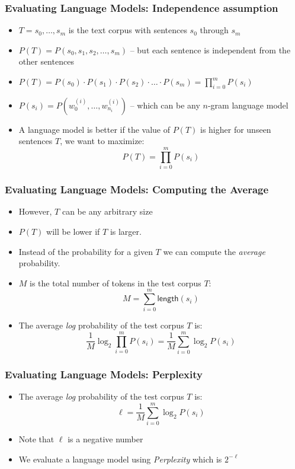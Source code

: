 \begin{frame}
\frametitle{Evaluating Language Models: Independence assumption}
\begin{itemize}[<+->]
\item $T = s_0, \ldots, s_m$ is the text corpus with sentences $s_0$ through $s_m$
\item $P(T) = P(s_0, s_1, s_2, \ldots, s_m)$ -- but each sentence is independent from the other sentences
\item $P(T) = P(s_0) \cdot P(s_1) \cdot P(s_2) \cdot \ldots \cdot P(s_m) = \prod_{i=0}^m P(s_i)$ 
\item $P(s_i) = P(w_0^{(i)}, \ldots, w_{n_i}^{(i)})$ -- which can be any $n$-gram language model
\item A language model is better if the value of $P(T)$ is higher for unseen sentences $T$, we want to maximize:
\[ P(T) = \prod_{i=0}^m P(s_i) \]
\end{itemize}
\end{frame}

\begin{frame}
\frametitle{Evaluating Language Models: Computing the Average}
\begin{itemize}[<+->]
\item However, $T$ can be any arbitrary size
\item $P(T)$ will be lower if $T$ is larger.
\item Instead of the probability for a given $T$ we can compute the {\em average} probability.
\item $M$ is the total number of tokens in the test corpus $T$:
\[ M = \sum_{i=0}^m \textsf{length}(s_i) \]
\item The average {\em log} probability of the test corpus $T$ is:
\[ \frac{1}{M} \log_2 \prod_{i=0}^m P(s_i) = \frac{1}{M} \sum_{i=0}^m \log_2 P(s_i) \]
\end{itemize}
\end{frame}

\begin{frame}
\frametitle{Evaluating Language Models: Perplexity}
\begin{itemize}[<+->]
\item The average {\em log} probability of the test corpus $T$ is:
\[ \ell = \frac{1}{M} \sum_{i=0}^m \log_2 P(s_i) \]
\item Note that $\ell$ is a negative number
\item We evaluate a language model using {\em Perplexity} which is $2^{-\ell}$
\end{itemize}
\end{frame}

